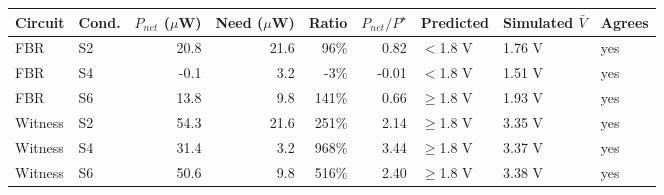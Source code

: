 \begin{tabular}{llrrrrlll}
\toprule
Circuit & Cond. & $P_{net}$ ($\mu$W) & Need ($\mu$W) & Ratio & $P_{net}/P^\star$ & Predicted & Simulated $\bar V$ & Agrees \\
\midrule
FBR & S2 & 20.8 & 21.6 & 96\% & 0.82 & $<$1.8 V & 1.76 V & yes \\
FBR & S4 & -0.1 & 3.2 & -3\% & -0.01 & $<$1.8 V & 1.51 V & yes \\
FBR & S6 & 13.8 & 9.8 & 141\% & 0.66 & $\geq$1.8 V & 1.93 V & yes \\
Witness & S2 & 54.3 & 21.6 & 251\% & 2.14 & $\geq$1.8 V & 3.35 V & yes \\
Witness & S4 & 31.4 & 3.2 & 968\% & 3.44 & $\geq$1.8 V & 3.37 V & yes \\
Witness & S6 & 50.6 & 9.8 & 516\% & 2.40 & $\geq$1.8 V & 3.38 V & yes \\
\bottomrule
\end{tabular}
